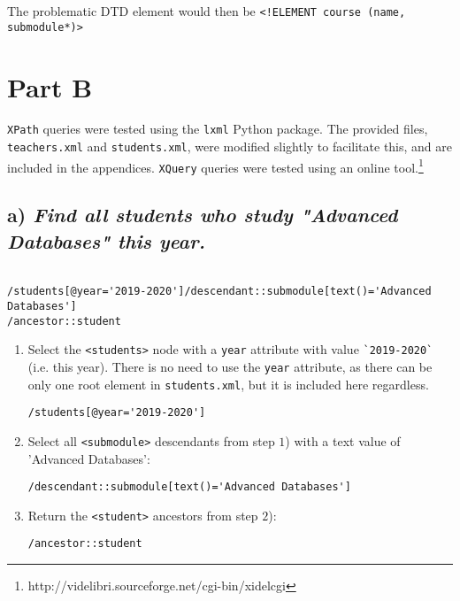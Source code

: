 \documentclass[11pt]{article} %
\begin{document}
The problematic DTD element would then be \verb|<!ELEMENT course (name, submodule*)>|

\clearpage

\section*{Part B}

\verb|XPath| queries were tested using the \verb|lxml| Python package. The provided files, \verb|teachers.xml| and \verb|students.xml|, were modified slightly to facilitate this, and are included in the appendices. \verb|XQuery| queries were tested using an online tool.\footnote{http://videlibri.sourceforge.net/cgi-bin/xidelcgi}

\subsection*{a) \textit{Find all students who study "Advanced Databases" this year.}}

\begin{verbatim}

/students[@year='2019-2020']/descendant::submodule[text()='Advanced Databases']
/ancestor::student

\end{verbatim}

\begin{enumerate}

	\item{Select the \verb|<students>| node with a \verb|year| attribute with value \verb|`2019-2020`| (i.e. this year). There is no need to use the \verb|year| attribute, as there can be only one root element in \verb|students.xml|, but it is included here regardless.}

\begin{center}

	\verb|/students[@year='2019-2020']|

\end{center}

	\item{Select all \verb|<submodule>| descendants from step $1$) with a text value of 'Advanced Databases':}

\begin{center}

	\verb|/descendant::submodule[text()='Advanced Databases']|

\end{center}

	\item{Return the \verb|<student>| ancestors from step $2$):}

\begin{center}

	\verb|/ancestor::student|

\end{center}

\end{enumerate}
\end{document}
